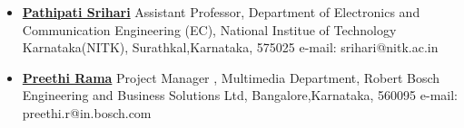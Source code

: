 \documentclass[margin, centered]{res}
\begin{document}
\begin{resume}
\begin{itemize}[leftmargin=*]
 \item \textbf{\href{http://ece.nitk.ac.in/faculty/pathipati-srihari}{Pathipati Srihari}}\newline
Assistant Professor, \newline
Department of Electronics and Communication Engineering (EC),\newline
National Institue of Technology Karnataka(NITK),\newline
Surathkal,Karnataka, 575025 \newline
e-mail: srihari@nitk.ac.in

 \item \textbf{\href{https://www.linkedin.com/in/preethi-r-46018399/}{Preethi Rama}}\newline
Project Manager , \newline
Multimedia Department,\newline
Robert Bosch Engineering and Business Solutions Ltd,\newline
Bangalore,Karnataka, 560095 \newline
e-mail: preethi.r@in.bosch.com


\end{itemize}

\end{resume}
\end{document}
